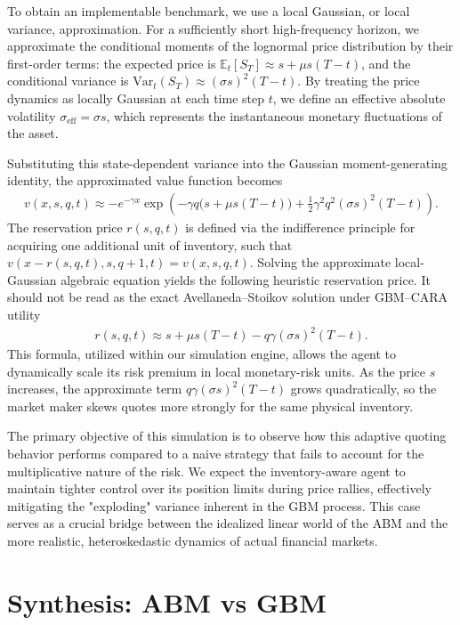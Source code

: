 \documentclass[a4paper,10pt,titlepage,oneside,openany]{book}
\theoremstyle{plain}\newtheorem{theorem}{Theorem}[chapter]
\theoremstyle{definition}\newtheorem{definition}{Definition}[chapter]
\theoremstyle{remark}\newtheorem{remark}{Remark}[chapter]
\begin{document}
To obtain an implementable benchmark, we use a local Gaussian, or local variance, approximation. For a sufficiently short high-frequency horizon, we approximate the conditional moments of the lognormal price distribution by their first-order terms: the expected price is $\mathbb{E}_t[S_T] \approx s + \mu s(T-t)$, and the conditional variance is $\text{Var}_t(S_T) \approx (\sigma s)^2(T-t)$. By treating the price dynamics as locally Gaussian at each time step $t$, we define an effective absolute volatility $\sigma_{\text{eff}} = \sigma s$, which represents the instantaneous monetary fluctuations of the asset.

Substituting this state-dependent variance into the Gaussian moment-generating identity, the approximated value function becomes
\begin{align*}
    v(x, s, q, t) \approx -e^{-\gamma x} \exp \left( -\gamma q \big(s + \mu s (T-t)\big) + \frac{1}{2} \gamma^2 q^2 (\sigma s)^2 (T-t) \right).
\end{align*}
The reservation price $r(s, q, t)$ is defined via the indifference principle for acquiring one additional unit of inventory, such that $v(x - r(s,q,t), s, q+1, t) = v(x, s, q, t)$. Solving the approximate local-Gaussian algebraic equation yields the following heuristic reservation price. It should not be read as the exact Avellaneda--Stoikov solution under GBM--CARA utility
\begin{align*}
    r(s, q, t) \approx s + \mu s(T-t) - q\gamma(\sigma s)^2(T-t).
\end{align*}
This formula, utilized within our simulation engine, allows the agent to dynamically scale its risk premium in local monetary-risk units. As the price $s$ increases, the approximate term $q\gamma(\sigma s)^2(T-t)$ grows quadratically, so the market maker skews quotes more strongly for the same physical inventory. 

The primary objective of this simulation is to observe how this adaptive quoting behavior performs compared to a naive strategy that fails to account for the multiplicative nature of the risk. We expect the inventory-aware agent to maintain tighter control over its position limits during price rallies, effectively mitigating the "exploding" variance inherent in the GBM process. This case serves as a crucial bridge between the idealized linear world of the ABM and the more realistic, heteroskedastic dynamics of actual financial markets.

\section{Synthesis: ABM vs GBM}
\end{document}
